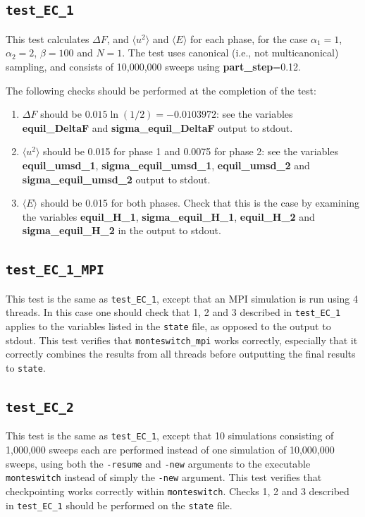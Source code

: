 \documentclass{report}
\begin{document}
\subsection{\texttt{test\_EC\_1}}
This test calculates $\Delta F$, and $\langle u^2\rangle$ and $\langle E\rangle$ for each phase, for the case $\alpha_1=1$, $\alpha_2=2$,
$\beta=100$ and $N=1$. The test uses canonical (i.e., not multicanonical) sampling, and consists of 10,000,000 sweeps using 
\textbf{part\_step}=0.12.

The following checks should be performed at the completion of the test:
\begin{enumerate}
\item
$\Delta F$ should be $0.015\ln(1/2)=-0.0103972$: see the variables \textbf{equil\_DeltaF} and \textbf{sigma\_equil\_DeltaF} output
to stdout. 
\item
$\langle u^2\rangle$ should be 0.015 for phase 1 and 0.0075 for phase 2: see the 
variables \textbf{equil\_umsd\_1}, \textbf{sigma\_equil\_umsd\_1}, \textbf{equil\_umsd\_2} and \textbf{sigma\_equil\_umsd\_2} 
output to stdout.
\item
$\langle E\rangle$ should be 0.015 for both phases. Check that this is the case by examining the variables 
\textbf{equil\_H\_1}, \textbf{sigma\_equil\_H\_1}, \textbf{equil\_H\_2} and \textbf{sigma\_equil\_H\_2} in the output to stdout. 
\end{enumerate}


\subsection{\texttt{test\_EC\_1\_MPI}}
This test is the same as \texttt{test\_EC\_1}, except that an MPI simulation is run using 4 threads. In this case one should check that
1, 2 and 3 described in \texttt{test\_EC\_1} applies to the variables listed in the \texttt{state} file, as opposed to the
output to stdout. This test verifies that \texttt{monteswitch\_mpi} works correctly, especially that it correctly combines
the results from all threads before outputting the final results to \texttt{state}.


\subsection{\texttt{test\_EC\_2}}
This test is the same as \texttt{test\_EC\_1}, except that 10 simulations consisting of 1,000,000 sweeps each are performed
instead of one simulation of 10,000,000 sweeps, using both the \texttt{-resume} and \texttt{-new} arguments to the executable 
\texttt{monteswitch} instead of simply the \texttt{-new} argument. This test verifies that checkpointing works
correctly within \texttt{monteswitch}. Checks 1, 2 and 3 described in \texttt{test\_EC\_1} should be performed on the 
\texttt{state} file.
\end{document}
